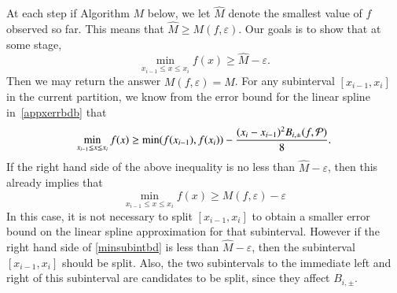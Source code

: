 \documentclass[review]{elsarticle}
\newcommand{\abstol}{\varepsilon}
\theoremstyle{definition}
\newcommand{\hM}{\widehat{M}}
\newcommand{\minfii}{\min(f(x_{i-1}), f(x_i))} %
\begin{document}
At each step if Algorithm $M$ below, we let $\hM$ denote the smallest value of
$f$ observed so far. This means that $\hM \ge M(f,\abstol)$. Our goals is to
show that at some stage,
\[
\min_{x_{i-1} \le x \le x_i} f(x) \ge \hM - \abstol.
\]
Then we may return the answer $M(f,\abstol) = \hM$. For any subinterval
$[x_{i-1}, x_i]$ in the current partition, we know from the error bound for the
linear spline in~\eqref{appxerrbdb} that
\begin{equation} \label{minsubintbd}
\min_{x_{i-1} \le x \le x_i} f(x) \ge \minfii -\frac{(x_i - x_{i-1})^2B_{i,\pm}(f,\cp)}{8}.
\end{equation}
If the right hand side of the above inequality is no less than $\hM - \abstol$,
then this already implies that
\[
\min_{x_{i-1} \le x \le x_i} f(x) \ge M(f,\abstol) - \abstol
\]
In this case, it is not necessary to split $[x_{i-1}, x_i]$ to obtain a smaller
error bound on the linear spline approximation for that subinterval. However if
the right hand side of \eqref{minsubintbd} is less than $\hM - \abstol$, then
the subinterval $[x_{i-1}, x_i]$ should be split. Also, the two subintervals to
the immediate left and right of this subinterval are candidates to be split,
since they affect $B_{i,\pm}$.
\end{document}
